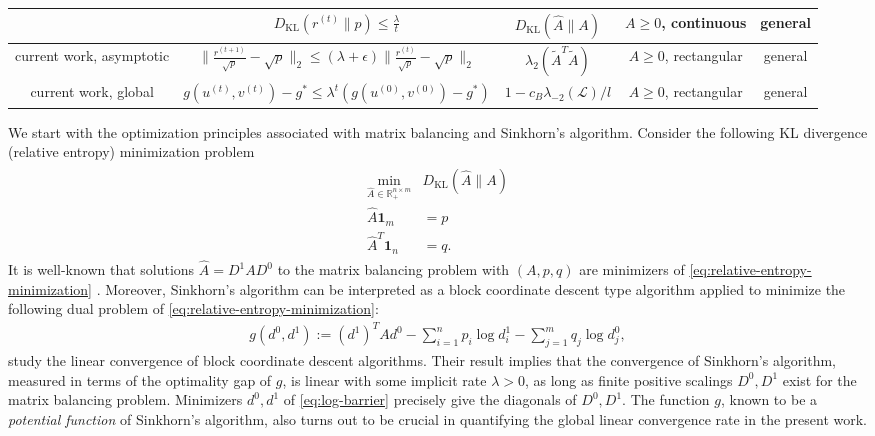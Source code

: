 \begin{table*}
\begin{adjustwidth}{-1.5cm}{}
\begin{centering}
\begin{tabular}{c|c|c|c|c}
\hline 
\citet{leger2021gradient} & $D_{\text{KL}}(r^{(t)}\| p) \leq\frac{\lambda}{t}$ & $D_{\text{KL}}(\hat{A}\| A)$ & $A\geq0$, continuous & general\tabularnewline
\hline 
current work, asymptotic & $\|\frac{r^{(t+1)}}{\sqrt{p}}-\sqrt{p}\|_{2}\leq(\lambda+\epsilon)\|\frac{r^{(t)}}{\sqrt{p}}-\sqrt{p}\|_{2}$ & $\lambda_{2}(\tilde{A}^T\tilde{A})$ & $A\geq0$, rectangular & general\tabularnewline
\hline 
current work, global & $g(u^{(t)},v^{(t)})-g^\ast\leq\lambda^t (g(u^{(0)},v^{(0)})-g^\ast)$ & $1-c_B\lambda_{-2}(\mathcal{L})/l$ & $A\geq0$, rectangular & general\tabularnewline
\end{tabular}
\par\end{centering}
\label{tab:convergence-summary}
\end{adjustwidth}
\end{table*}
We start with the optimization principles associated with matrix balancing and Sinkhorn's algorithm. Consider the following KL divergence (relative entropy) minimization problem 
     \begin{align}
\label{eq:relative-entropy-minimization}
\begin{split}
  \min_{\hat A\in \mathbb{R}^{n\times m}_+} & D_{\text{KL}}(\hat{A}\| A)\\
\hat{A}\mathbf{1}_m & =p\\
\hat{A}^{T}\mathbf{1}_n & =q.
\end{split}
\end{align}
It is well-known that solutions $\hat{A}=D^1AD^0$ to the matrix balancing problem with $(A,p,q)$ are minimizers of \eqref{eq:relative-entropy-minimization} \citep{ireland1968contingency,bregman1967proof}. Moreover, Sinkhorn's algorithm can be interpreted as a block coordinate descent type algorithm applied to minimize the following dual problem of \eqref{eq:relative-entropy-minimization}:
 \begin{align}
 \label{eq:log-barrier}
     g(d^0,d^1)	:=(d^1)^{T}Ad^0-\sum_{i=1}^{n}p_{i}\log d^1_{i}-\sum_{j=1}^{m}q_{j}\log d^0_{j},
\end{align} 
\citet{luo1992convergence} study the linear convergence of block coordinate descent algorithms. Their result implies that the
convergence of Sinkhorn's algorithm, measured in terms of the optimality gap of $g$, is linear with some implicit rate $\lambda>0$,
 as long as finite positive scalings $D^0,D^1$ exist for the matrix balancing problem. Minimizers $d^0,d^1$ of \eqref{eq:log-barrier} precisely give the diagonals of $D^0,D^1$. The function $g$, known to be a \emph{potential function} of Sinkhorn's algorithm, also turns out to be crucial in quantifying the global linear convergence rate in the present work. 

